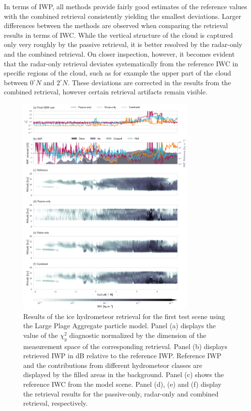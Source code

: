 \documentclass[journal abbreviation, manuscript]{copernicus}
\begin{document}
In terms of IWP, all methods provide fairly good estimates of the reference
values with the combined retrieval consistently yielding the smallest
deviations. Larger differences between the methods are observed when comparing
the retrieval results in terms of IWC. While the vertical structure of the cloud
is captured only very roughly by the passive retrieval, it is better resolved by
the radar-only and the combined retrieval. On closer inspection, however, it
becomes evident that the radar-only retrieval deviates systematically from the
reference IWC in specific regions of the cloud, such as for example the upper
part of the cloud between $0^\circ N$ and $2^\circ N$. These deviations are
corrected in the results from the combined retrieval, however certain retrieval
artifacts remain visible.

\begin{figure}
\centering
\includegraphics[width = 0.8\textwidth]{../plots/results_a_LargePlateAggregate}
\caption{Results of the ice hydrometeor retrieval for the first test scene using
  the Large Plage Aggregate particle model. Panel (a) displays the value of the
  $\chi^2_y$ diagnostic normalized by the dimension of the measurement space of
  the corresponding retrieval. Panel (b) displays retrieved IWP in dB relative
  to the reference IWP. Reference IWP and the contributions from different
  hydrometeor classes are displayed by the filled areas in the background. Panel
  (c) shows the reference IWC from the model scene. Panel (d), (e) and (f)
  display the retrieval results for the passive-only, radar-only and combined
  retrieval, respectively.}
\label{fig:results_a}
\end{figure}
\end{document}
